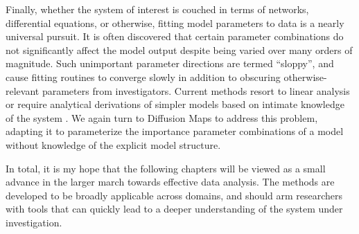 Finally, whether the system of interest is couched in terms of
networks, differential equations, or otherwise, fitting model
parameters to data is a nearly universal pursuit. It is often
discovered that certain parameter combinations do not significantly
affect the model output despite being varied over many orders of
magnitude. Such unimportant parameter directions are termed
``sloppy'', and cause fitting routines to converge slowly in addition
to obscuring otherwise-relevant parameters from investigators. Current
methods resort to linear analysis or require analytical derivations
of simpler models based on intimate knowledge of the system
\cite{sensitivity analysis; mbam}. We again turn to Diffusion Maps to
address this problem, adapting it to parameterize the importance
parameter combinations of a model without knowledge of the explicit
model structure.

In total, it is my hope that the following chapters will be viewed as
a small advance in the larger march towards effective data
analysis. The methods are developed to be broadly applicable across
domains, and should arm researchers with tools that can quickly lead
to a deeper understanding of the system under investigation.


















